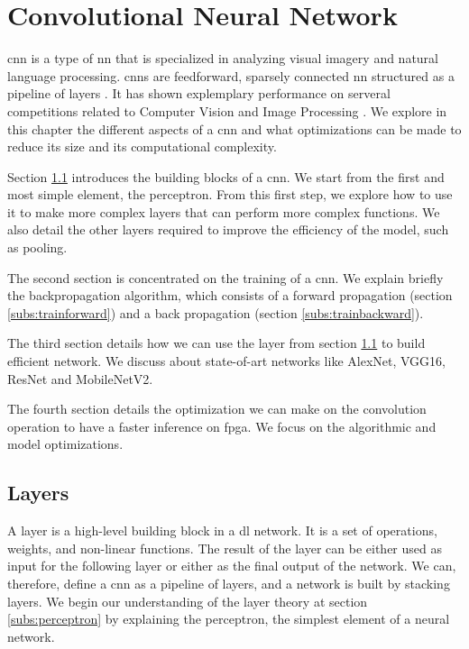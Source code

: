 \chapter{Convolutional Neural Network} \label{chap:cnn}
\acrfull{cnn} is a type of \acrlong{nn} that is specialized in analyzing visual imagery and natural language processing. \acrshort{cnn}s are feedforward, sparsely connected \acrshort{nn} structured as a pipeline of layers \cite{abdelouahab_accelerating_2018}. It has shown explemplary performance on serveral competitions related to Computer Vision and Image Processing \cite{khan_survey_2020}. We explore in this chapter the different aspects of a \acrshort{cnn} and what optimizations can be made to reduce its size and its computational complexity.

Section \ref{sec:layer} introduces the building blocks of a \acrshort{cnn}. We start from the first and most simple element, the perceptron. From this first step, we explore how to use it to make more complex layers that can perform more complex functions. We also detail the other layers required to improve the efficiency of the model, such as pooling.

The second section is concentrated on the training of a \acrshort{cnn}. We explain briefly the backpropagation algorithm, which consists of a forward propagation (section \ref{subs:trainforward}) and a back propagation (section \ref{subs:trainbackward}).

The third section details how we can use the layer from section \ref{sec:layer} to build efficient network. We discuss about state-of-art networks like AlexNet, VGG16, ResNet and MobileNetV2.

The fourth section details the optimization we can make on the convolution operation to have a faster inference on \acrshort{fpga}. We focus on the algorithmic and model optimizations.
%
%
\section{Layers} \label{sec:layer}
A layer is a high-level building block in a \acrshort{dl} network. It is a set of operations, weights, and non-linear functions. The result of the layer can be either used as input for the following layer or either as the final output of the network. We can, therefore, define a \acrshort{cnn} as a pipeline of layers, and a network is built by stacking layers. We begin our understanding of the layer theory at section \ref{subs:perceptron} by explaining the perceptron, the simplest element of a neural network.
%
%

%

%

%

%

%

%
%
